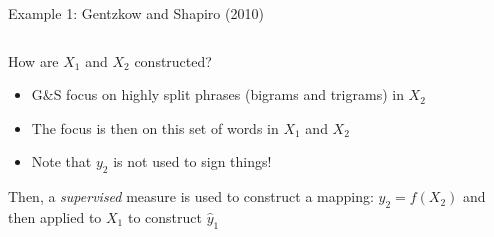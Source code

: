\documentclass[notes,11pt, aspectratio=169]{beamer}
\newenvironment{wideitemize}{\itemize\addtolength{\itemsep}{10pt}}{\enditemize}
\begin{document}
\begin{frame}{Example 1: Gentzkow and Shapiro (2010)}
  \begin{columns}[onlytextwidth, T] %
    \begin{column}{.5\textwidth}
      \begin{wideitemize}
      \item How are $X_{1}$ and $X_{2}$ constructed?
        \begin{itemize}
        \item G\&S focus on highly split phrases (bigrams and trigrams) in $X_{2}$
        \item The focus is then on this set of words in $X_{1}$ and $X_{2}$
        \item Note that $y_{2}$ is not used to sign things!
        \end{itemize}
      \item Then, a \emph{supervised} measure is used to construct a
        mapping: $y_{2} = f(X_{2})$ and then applied to $X_{1}$ to
        construct $\hat{y}_{1}$
      \end{wideitemize}
    \end{column}%
    \hfill%
    \begin{column}{.5\textwidth}
    \end{column}%
  \end{columns}
\end{frame}
\end{document}
